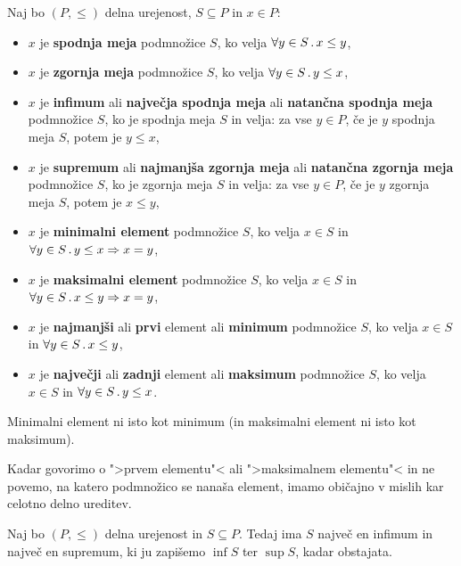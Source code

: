 \begin{definicija}
  Naj bo $(P, {\leq})$ delna urejenost, $S \subseteq P$ in $x \in P$:
  \begin{itemize}

  \item $x$ je \textbf{spodnja meja} podmnožice $S$, ko velja $\forall y \in S \,.\, x \leq y$,

  \item $x$ je \textbf{zgornja meja} podmnožice $S$, ko velja $\forall y \in S \,.\, y \leq x$,

  \item $x$ je \textbf{infimum} ali \textbf{največja spodnja meja} ali \textbf{natančna spodnja meja} podmnožice $S$, ko je spodnja meja $S$ in velja: za vse $y \in P$, če je $y$ spodnja meja
    $S$, potem je $y \leq x$,

  \item $x$ je \textbf{supremum} ali \textbf{najmanjša zgornja meja} ali \textbf{natančna zgornja meja} podmnožice $S$, ko je zgornja meja $S$ in velja: za vse $y \in P$, če je $y$ zgornja meja $S$, potem je $x \leq y$,

  \item $x$ je \textbf{minimalni element} podmnožice $S$, ko velja $x \in S$ in $\forall y \in S \,.\, y \leq x \Rightarrow x = y$,

  \item $x$ je \textbf{maksimalni element} podmnožice $S$, ko velja $x \in S$ in
      $\forall y \in S \,.\, x \leq y \Rightarrow x = y$,

  \item $x$ je \textbf{najmanjši} ali \textbf{prvi} element ali \textbf{minimum} podmnožice $S$, ko velja $x \in S$ in $\forall y \in S \,.\, x \leq y$,

  \item $x$ je \textbf{največji} ali \textbf{zadnji} element ali \textbf{maksimum} podmnožice $S$, ko velja $x \in S$ in $\forall y \in S \,.\, y \leq x$.
\end{itemize}
\end{definicija}

\begin{opomba}
  Minimalni element ni isto kot minimum (in maksimalni element ni isto kot maksimum).
\end{opomba}

Kadar govorimo o ">prvem elementu"< ali ">maksimalnem elementu"< in ne povemo, na
katero podmnožico se nanaša element, imamo običajno v mislih kar celotno delno
ureditev.

\begin{izrek}
  Naj bo $(P, {\leq})$ delna urejenost in $S \subseteq P$. Tedaj ima $S$ največ en
  infimum in največ en supremum, ki ju zapišemo $\inf S$ ter $\sup S$, kadar obstajata.
\end{izrek}

